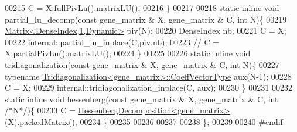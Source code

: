 \begin{DoxyCode}
00215     C = X.fullPivLu().matrixLU();
00216   \}
00217 
00218   \textcolor{keyword}{static} \textcolor{keyword}{inline} \textcolor{keywordtype}{void} partial\_lu\_decomp(\textcolor{keyword}{const} gene\_matrix & X, gene\_matrix & C, \textcolor{keywordtype}{int}  N)\{
00219     \hyperlink{group___core___module_class_eigen_1_1_matrix}{Matrix<DenseIndex,1,Dynamic>} piv(N);
00220     DenseIndex nb;
00221     C = X;
00222     internal::partial\_lu\_inplace(C,piv,nb);
00223 \textcolor{comment}{//     C = X.partialPivLu().matrixLU();}
00224   \}
00225 
00226   \textcolor{keyword}{static} \textcolor{keyword}{inline} \textcolor{keywordtype}{void} tridiagonalization(\textcolor{keyword}{const} gene\_matrix & X, gene\_matrix & C, \textcolor{keywordtype}{int}  N)\{
00227     \textcolor{keyword}{typename} \hyperlink{group___core___module}{Tridiagonalization<gene\_matrix>::CoeffVectorType}
       aux(N-1);
00228     C = X;
00229     internal::tridiagonalization\_inplace(C, aux);
00230   \}
00231 
00232   \textcolor{keyword}{static} \textcolor{keyword}{inline} \textcolor{keywordtype}{void} hessenberg(\textcolor{keyword}{const} gene\_matrix & X, gene\_matrix & C, \textcolor{keywordtype}{int}  \textcolor{comment}{/*N*/})\{
00233     C = \hyperlink{group___eigenvalues___module_class_eigen_1_1_hessenberg_decomposition}{HessenbergDecomposition<gene\_matrix>}(X).packedMatrix();
00234   \}
00235 
00236 
00237 
00238 \};
00239 
00240 \textcolor{preprocessor}{#endif}
\end{DoxyCode}
